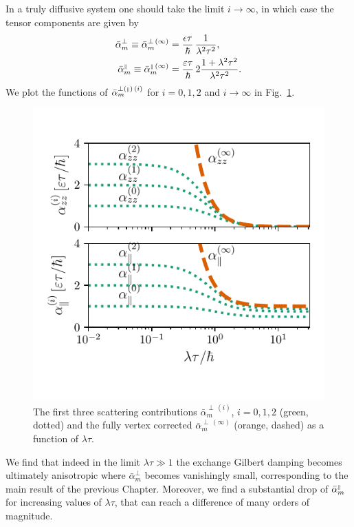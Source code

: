 In a truly diffusive system one should take the limit $i\rightarrow\infty$, in which case the tensor components are given by
\begin{align}
\label{eq:alphaperpzerodelta}
    \bar{\alpha}_{m}^{\perp}\equiv\bar{\alpha}_{m}^{\perp\,(\infty)}  & = \frac{\epsilon \tau}{\hbar}\, \frac{1}{\lambda^2\tau^2},\\
  \label{eq:alphaparallelzerodelta}  \bar{\alpha}_{m}^{{\scriptscriptstyle\parallel}}\equiv\bar{\alpha}_{m}^{{\scriptscriptstyle\parallel}\,(\infty)}  & = \frac{\varepsilon\tau}{\hbar}\,2\frac{1+\lambda^2\tau^2}{\lambda^2\tau^2}.
\end{align}
We plot the functions of $\bar{\alpha}_{m}^{\perp({\scriptscriptstyle\parallel})\,(i)}$ for $i=0,1,2$ and $i\rightarrow\infty$ in Fig.~\ref{fig:alpha_plot}. 
\begin{figure}
    \centering
    \includegraphics[width=0.75\linewidth]{gfx/Chapter04/alpha_plot2}
    \caption{The first three scattering contributions $\bar{\alpha}_{m}^{\perp\,(i)}$, $i=0,1,2$ (green, dotted) and the fully vertex corrected $\bar{\alpha}_{m}^{\perp\,(\infty)}$ (orange, dashed) as a function of $\lambda \tau$. }
    \label{fig:alpha_plot}
\end{figure}

We find that indeed in the limit $\lambda\tau\gg1$ the exchange Gilbert damping becomes ultimately anisotropic where $\bar{\alpha}_{m}^{\perp}$ becomes vanishingly small, corresponding to the main result of the previous Chapter. Moreover, we find a substantial drop of $\bar{\alpha}_{m}^{{\scriptscriptstyle\parallel}}$ for increasing values of $\lambda\tau$, that can reach a difference of many orders of magnitude. 

